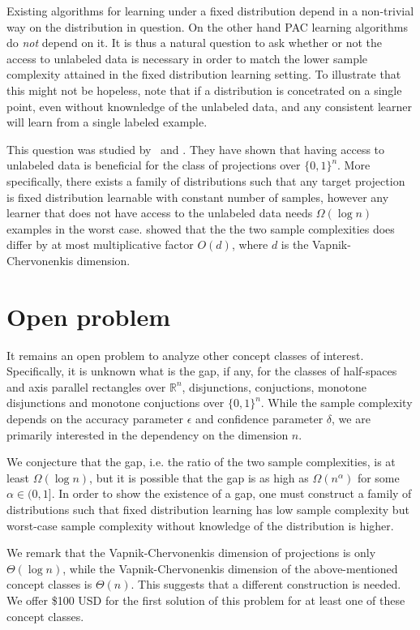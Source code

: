 \documentclass[12pt]{colt2019}
\newcommand{\R}{\mathbb{R}}
\begin{document}
Existing algorithms for learning under a fixed distribution depend in a
non-trivial way on the distribution in question. On the other hand PAC learning
algorithms do \emph{not} depend on it. It is thus a natural question to ask
whether or not the access to unlabeled data is necessary in order to match the
lower sample complexity attained in the fixed distribution learning setting.
To illustrate that this might not be hopeless, note that if a distribution
is concetrated on a single point, even without knownledge of the unlabeled data,
and any consistent learner will learn from a single labeled example.

This question was studied by~\cite{Darnstadt-Simon-Szorenyi-2013} and
\cite{Golovnev-Pal-Szorenyi-2019}. They have shown that having access to
unlabeled data is beneficial for the class of projections over $\{0,1\}^n$. More
specifically, there exists a family of distributions such that any target
projection is fixed distribution learnable with constant number of samples,
however any learner that does not have access to the unlabeled data needs
$\Omega(\log n)$ examples in the worst case.
\cite{Darnstadt-Simon-Szorenyi-2013} showed that the the two sample complexities
does differ by at most multiplicative factor $O(d)$, where $d$ is the
Vapnik-Chervonenkis dimension.

\section{Open problem}

It remains an open problem to analyze other concept classes of interest.
Specifically, it is unknown what is the gap, if any, for the classes of
half-spaces and axis parallel rectangles over $\R^n$, disjunctions, conjuctions,
monotone disjunctions and monotone conjuctions over $\{0,1\}^n$. While the
sample complexity depends on the accuracy parameter $\epsilon$ and confidence
parameter $\delta$, we are primarily interested in the dependency on the
dimension $n$.

We conjecture that the gap, i.e. the ratio of the two sample complexities, is at
least $\Omega(\log n)$, but it is possible that the gap is as high as
$\Omega(n^\alpha)$ for some $\alpha \in (0,1]$. In order to show the existence
of a gap, one must construct a family of distributions such that fixed
distribution learning has low sample complexity but worst-case sample complexity
without knowledge of the distribution is higher.

We remark that the Vapnik-Chervonenkis dimension of projections is only
$\Theta(\log n)$, while the Vapnik-Chervonenkis dimension of the above-mentioned
concept classes is $\Theta(n)$. This suggests that a different construction is
needed. We offer \$100 USD for the first solution of this problem for at least
one of these concept classes.


\end{document}
